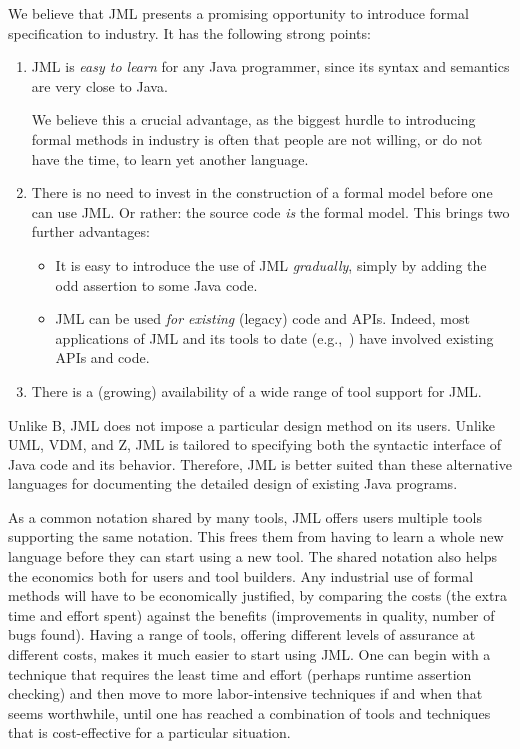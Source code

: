 \documentclass{entcs}
\begin{document}
We believe that JML presents a promising opportunity to introduce
formal specification to industry.  It has the following strong points:

\begin{enumerate}
\item JML is {\em easy to learn} for any Java programmer, since its
  syntax and semantics are very close to Java.
  
  We believe this a crucial advantage, as the biggest hurdle to
  introducing formal methods in industry is often that people are not
  willing, or do not have the time, to learn yet another language.
  
\item There is no need to invest in the construction of a formal model
  before one can use JML\@. Or rather: the source code {\em is} the
  formal model.  This brings two further advantages:
  \begin{itemize}
  \item It is easy to introduce the use of JML {\em gradually}, simply
    by adding the odd assertion to some Java code.
  \item JML can be used {\em for existing} (legacy) code and APIs.
    Indeed, most applications of JML and its tools to date
    (e.g.,~\cite{BreunesseBJ02,CatanoHuisman02,PollBergJacobs01}) have
    involved existing APIs and code.
  \end{itemize}

\item There is a (growing) availability of a wide range of tool
      support for JML\@.
\end{enumerate}

Unlike B, JML does not impose a particular design method on its users.
Unlike UML, VDM, and Z, JML is tailored to specifying both the syntactic
interface of Java code and its behavior.
Therefore, JML is better suited than these alternative languages
for documenting the detailed design of existing Java programs.

\smallskip

As a common notation shared by many tools, JML offers users multiple
tools supporting the same notation.  This frees them from having to
learn a whole new language before they can start using a new tool.
The shared notation also helps the economics both for users and tool
builders.  Any industrial use of formal methods will have to be
economically justified, by comparing the costs (the extra time and
effort spent) against the benefits (improvements in quality, number of
bugs found).  Having a range of tools, offering different levels of
assurance at different costs, makes it much easier to start using JML\@.
One can begin with a technique that requires the least time and effort
(perhaps runtime assertion checking) and then move to more
labor-intensive techniques if and when that seems worthwhile, until
one has reached a combination of tools and techniques that is
cost-effective for a particular situation.
\end{document}
